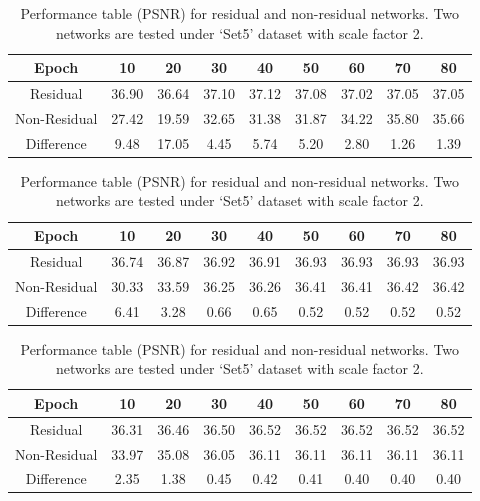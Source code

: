\documentclass[10pt,twocolumn,letterpaper]{article}
\begin{document}
\begin{table}
\centering
\begin{subtable}[t]{0.9\linewidth}
\centering
\begin{tabular}{|c||c|c|c|c|c|c|c|c|}
\hline
 Epoch& 10& 20& 30& 40& 50& 60& 70& 80\\\hline
 Residual& 36.90& 36.64& 37.10& 37.12& 37.08& 37.02& 37.05&  \color{red}37.05\\
 Non-Residual& 27.42& 19.59& 32.65& 31.38& 31.87& 34.22& 35.80&  \color{red}35.66\\\hline
 Difference& 9.48& 17.05& 4.45& 5.74& 5.20& 2.80& 1.26&  \color{red}1.39\\\hline
\end{tabular}
\caption{Initial learning rate 0.1}
\end{subtable}
\begin{subtable}[t]{0.9\linewidth}
\centering
\begin{tabular}{|c||c|c|c|c|c|c|c|c|}
\hline
 Epoch& 10& 20& 30& 40& 50& 60& 70& 80\\\hline
 Residual& 36.74& 36.87& 36.92& 36.91& 36.93& 36.93& 36.93&  \color{red}36.93\\
 Non-Residual& 30.33& 33.59& 36.25& 36.26& 36.41& 36.41& 36.42&  \color{red}36.42\\\hline
 Difference& 6.41& 3.28& 0.66& 0.65& 0.52& 0.52& 0.52&  \color{red}0.52\\\hline
\end{tabular}
\caption{Initial learning rate 0.01}
\end{subtable}
\begin{subtable}[t]{0.9\linewidth}
\centering
\begin{tabular}{|c||c|c|c|c|c|c|c|c|}
\hline
 Epoch& 10& 20& 30& 40& 50& 60& 70& 80\\\hline
 Residual& 36.31& 36.46& 36.50& 36.52& 36.52& 36.52& 36.52&  \color{red}36.52\\
 Non-Residual& 33.97& 35.08& 36.05& 36.11& 36.11& 36.11& 36.11&  \color{red}36.11\\\hline
 Difference& 2.35& 1.38& 0.45& 0.42& 0.41& 0.40& 0.40&  \color{red}0.40\\\hline
\end{tabular}
\caption{Initial learning rate 0.001}
\end{subtable}
\caption{Performance table (PSNR) for residual and non-residual networks. Two networks are tested under `Set5' dataset with scale factor 2.}
\end{table}
\end{document}
